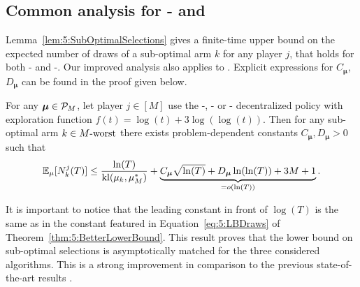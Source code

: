 \subsection{Common analysis for \RandTopM- and \MCTopM}\label{sub:5:UpperBoundSelections}

Lemma~\ref{lem:5:SubOptimalSelections} gives a finite-time upper bound on the expected number of draws of a sub-optimal arm $k$ for any player $j$, that
holds for both \RandTopM-\klUCB{} and \MCTopM-\klUCB.
Our improved analysis also applies to \rhoRand{}.
Explicit expressions for $C_{\boldsymbol{\mu}}$, $D_{\boldsymbol{\mu}}$ can be found in the proof given below.

\begin{lemma}\label{lem:5:SubOptimalSelections}
\begin{leftbar}[lemmabar]  %
  For any $\boldsymbol{\mu}\in\mathcal{P}_M$,
  let player $j\in[M]$ use the \RandTopM-, \MCTopM- or \rhoRand-\klUCB{}
  decentralized policy with exploration function $f(t) = \log(t) + 3 \log(\log(t))$.
  Then for any sub-optimal arm $k \in M\text{-}\mathrm{worst}$ there exists problem-dependent constants $C_{\boldsymbol{\mu}}, D_{\boldsymbol{\mu}} > 0$ such that
  \begin{equation}\label{eq:5:SubOptimalSelections}
      \mathbb{E}_{\mu}[N_k^j(T)] \leq
      \frac{\ln(T)}{\mathrm{kl}(\mu_k,\mu_{M}^*)}
      + \underbrace{C_{\boldsymbol{\mu}} \sqrt{\ln(T)} + D_{\boldsymbol{\mu}}\ln(\ln(T)) + 3M + 1}_{= \mathop{}\mathopen{}o\mathopen{}\left(\ln(T)\right)}.
  \end{equation}
\end{leftbar}  %
\end{lemma}

It is important to notice that the leading constant in front of $\log(T)$ is the same as in the constant featured in Equation~\eqref{eq:5:LBDraws} of Theorem~\ref{thm:5:BetterLowerBound}. This result proves that the lower bound on sub-optimal selections is asymptotically matched for the three considered algorithms. This is a strong improvement in comparison to the previous state-of-the-art results
\citep{Zhao10,Anandkumar11}.


